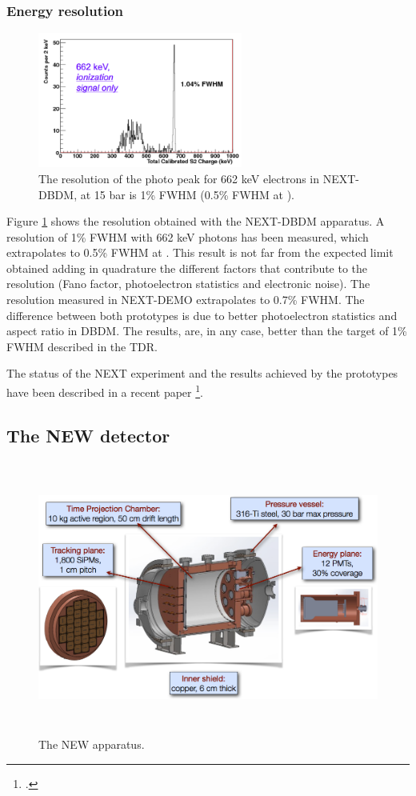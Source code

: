 \documentclass[a4paper,11pt,oneside]{article}
\begin{document}
\subsubsection*{Energy resolution}

\begin{figure}
\centering
\includegraphics[width=0.6\textwidth]{img/Cs660.png}
\caption{\small The resolution of the photo peak for 662 keV electrons in NEXT-DBDM, at 15 bar is 1\% FWHM (0.5\% FWHM at \Qbb).}\label{fig.ERES}
\end{figure}

Figure \ref{fig.ERES} shows the resolution obtained with the NEXT-DBDM apparatus. A resolution of 1\% FWHM with 
662 keV photons has been measured, which extrapolates to 0.5\% FWHM at \Qbb. This result is not far from the expected limit obtained adding in quadrature the different factors that contribute to the resolution (Fano factor, photoelectron statistics and electronic noise). The resolution measured in NEXT-DEMO extrapolates to 0.7\% FWHM. The difference between both prototypes is due to better photoelectron statistics and aspect ratio in DBDM. The results, are, in any case, better than the target of 1\% FWHM described in the TDR.

The status of the NEXT experiment and the results achieved by the prototypes have been described in a recent
paper \footcite{Gomez-Cadenas:2013lta}.

\subsection*{The NEW detector}
\label{sec.new}

\begin{figure}
\centering
\includegraphics[height=9cm]{img/NEW.png}
\caption{The NEW apparatus.} \label{fig:NEW}
\end{figure} 
\end{document}
